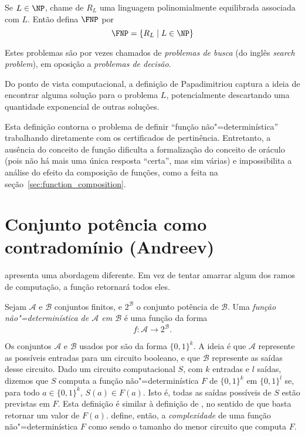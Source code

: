\begin{definition}
    Se $L \in \NP$, chame de $R_L$
    uma linguagem polinomialmente equilibrada associada com $L$.
    Então defina $\FNP$ por
    \begin{equation*}
        \FNP = \{R_L \mid L \in \NP\}
    \end{equation*}
    \cite[p.~229]{Papadimitriou1994}
\end{definition}

Estes problemas são por vezes chamados de \emph{problemas de busca}
(do inglês \emph{search problem}),
em oposição a \emph{problemas de decisão}.

Do ponto de vista computacional,
a definição de Papadimitriou captura a ideia de
encontrar alguma solução para o problema $L$,
potencialmente descartando uma quantidade exponencial de outras soluções.

Esta definição contorna o problema de definir ``função não"=determinística''
trabalhando diretamente com os certificados de pertinência.
Entretanto,
a ausência do conceito de função
dificulta a formalização do conceito de oráculo
(pois não há mais uma única resposta ``certa'',
mas sim várias)
e impossibilita a análise do efeito da composição de funções,
como a feita na seção~\ref{sec:function_composition}.

\section{Conjunto potência como contradomínio (Andreev)}

apresenta uma abordagem diferente.
Em vez de tentar amarrar algum dos ramos de computação,
a função retornará todos eles.

\begin{definition}
    Sejam $\mathcal A$ e $\mathcal B$ conjuntos finitos,
    e $2^\mathcal B$ o conjunto potência de $\mathcal B$.
    Uma \emph{função não"=determinística de $\mathcal A$ em $\mathcal B$}
    é uma função da forma
    \begin{equation*}
        f : \mathcal A \to 2^\mathcal B.
    \end{equation*}
    \cite[p.~3]{Andreev1994}
\end{definition}

Os conjuntos $\mathcal A$ e $\mathcal B$ usados por 
são da forma $\{0, 1\}^k$.
A ideia é que $\mathcal A$ represente as possíveis entradas para um circuito booleano,
e que $\mathcal B$ represente as saídas desse circuito.
Dado um circuito computacional $S$,
com $k$ entradas e $l$ saídas,
dizemos que $S$ computa a função não"=determinística $F$ de $\{0, 1\}^k$ em $\{0, 1\}^l$
se,
para todo $a \in \{0, 1\}^k$,
$S(a) \in F(a)$.
Isto é,
todas as saídas possíveis de $S$ estão previstas em $F$.
Esta definição é similar à definição de ,
no sentido de que basta retornar um valor de $F(a)$.
define, então,
a \emph{complexidade} de uma função não"=determinística $F$
como sendo o tamanho do menor circuito que computa $F$.

